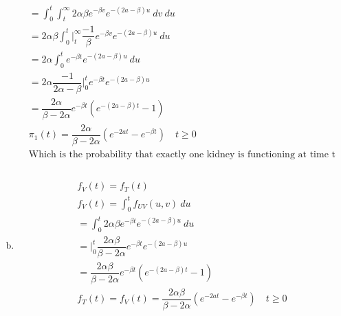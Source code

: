 \documentclass{article}
\begin{document}
\begin{flushleft}
\begin{enumerate}[(a)]
\begin{multline*}
=\int_{0}^{t}\int_{t}^{\infty}2\alpha \beta e^{-\beta v}e^{-(2a-\beta)u}\ dv \ du \\
=2\alpha \beta \int_{0}^{t}\bigg|_{t}^{\infty} \dfrac{-1}{\beta}e^{-\beta v}e^{-(2a-\beta)u} \ du \\
=2\alpha \int_{0}^{t} e^{-\beta t}e^{-(2a-\beta)u} \ du \\
=2\alpha \dfrac{-1}{2\alpha-\beta}\bigg|_{0}^{t} e^{-\beta t}e^{-(2a-\beta)u} \\
= \dfrac{2\alpha}{\beta-2\alpha} e^{-\beta t}(e^{-(2a-\beta)t}-1) \\
\pi_1(t)= \dfrac{2\alpha}{\beta-2\alpha} (e^{-2at}-e^{-\beta t}) \quad t\geq 0 \\
\text{Which is the probability that exactly one kidney is functioning at time t}\\
\end{multline*}
\item 
\begin{multline*}\\
f_V(t)=f_T(t)\\
f_V(t)=\int_{0}^{t}f_{UV}(u,v) \ du\\
=\int_{0}^{t}2\alpha \beta e^{-\beta t}e^{-(2a-\beta)u} \ du\\
=\bigg|_{0}^{t}\dfrac{2\alpha \beta}{\beta-2\alpha} e^{-\beta t}e^{-(2a-\beta)u}\\
=\dfrac{2\alpha \beta}{\beta-2\alpha}e^{-\beta t}(e^{-(2a-\beta)t}-1)\\
f_T(t)=f_V(t)=\dfrac{2\alpha \beta}{\beta-2\alpha}(e^{-2at}-e^{-\beta t})\quad t\geq 0\\
\end{multline*}
\end{enumerate}
\end{flushleft}
\end{document}
